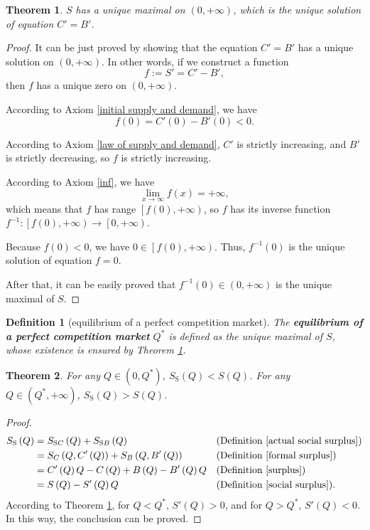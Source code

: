 \documentclass{article}
\newtheorem{theorem}{Theorem}[subsection]
\newtheorem{definition}{Definition}[subsection]
\begin{document}
\begin{theorem}
\label{perfect competition equilibrium}
$S$ has a unique maximal on $\left(0,+\infty\right)$,
which is the unique solution of equation $C'=B'$.
\end{theorem}
\begin{proof}
It can be just proved by showing that the equation $C'=B'$ has a unique solution on $\left(0,+\infty\right)$.
In other words, if we construct a function $$f:=S'=C'-B',$$ then $f$ has a unique zero on $\left(0,+\infty\right)$.

According to Axiom \ref{initial supply and demand}, we have
$$f\left(0\right)=C'\left(0\right)-B'\left(0\right)<0.$$

According to Axiom \ref{law of supply and demand}, $C'$ is strictly increasing, and $B'$ is strictly decreasing, so $f$ is strictly increasing.

According to Axiom \ref{inf}, we have
$$\lim_{x\to\infty}f\left(x\right)=+\infty,$$
which means that $f$ has range $\left[f\left(0\right),+\infty\right)$,
so $f$ has its inverse function $f^{-1}:\left[f\left(0\right),+\infty\right)\to\left[0,+\infty\right)$.

Because $f\left(0\right)<0$, we have $0\in\left[f\left(0\right),+\infty\right)$.
Thus, $f^{-1}\left(0\right)$ is the unique solution of equation $f=0$.

After that, it can be easily proved that $f^{-1}\left(0\right)\in\left(0,+\infty\right)$ is the unique maximal of $S$.
\end{proof}

\begin{definition}[equilibrium of a perfect competition market]
\label{def perfect competition equilibrium}
The \textbf{equilibrium of a perfect competition market} $Q^*$ is defined as the unique maximal of $S$, whose existence is ensured by Theorem \ref{perfect competition equilibrium}.
\end{definition}

\begin{theorem}
\label{difference in social and actual social}
For any $Q\in\left(0,Q^*\right)$, $S_\mathrm S\left(Q\right)<S\left(Q\right)$.
For any $Q\in\left(Q^*,+\infty\right)$, $S_\mathrm S\left(Q\right)>S\left(Q\right)$.
\end{theorem}
\begin{proof}
\begin{align*}
S_\mathrm S\left(Q\right)&=S_{\mathrm SC}\left(Q\right)+S_{\mathrm SB}\left(Q\right)&&\text{(Definition \ref{actual social surplus})}\\
&=S_C\left(Q,C'\left(Q\right)\right)+S_B\left(Q,B'\left(Q\right)\right)&&\text{(Definition \ref{formal surplus})}\\
&=C'\left(Q\right)Q-C\left(Q\right)+B\left(Q\right)-B'\left(Q\right)Q&&\text{(Definition \ref{surplus})}\\
&=S\left(Q\right)-S'\left(Q\right)Q&&\text{(Definition \ref{social surplus})}.
\end{align*}
According to Theorem \ref{perfect competition equilibrium},
for $Q<Q^*$, $S'\left(Q\right)>0$, and for $Q>Q^*$, $S'\left(Q\right)<0$.
In this way, the conclusion can be proved.
\end{proof}
\end{document}
